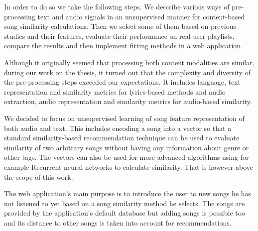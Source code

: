 In order to do so we take the following steps. We describe various ways of pre-processing text and audio signals in an unsupervised manner for content-based song similarity calculations. Then we select some of them based on previous studies and their features, evaluate their performance on real user playlists, compare the results and then implement fitting methods in a web application.

Although it originally seemed that processing both content modalities are similar, during our work on the thesis, it turned out that the complexity and diversity of the pre-processing steps exceeded our expectations. It includes language, text representation and similarity metrics for lyrics-based methods and audio extraction, audio representation
and similarity metrics for audio-based similarity. 

We decided to focus on unsupervised learning of song feature representation of both audio and text. This includes encoding a song into a vector so that a standard similarity-based recommendation technique can be used to evaluate similarity of two arbitrary songs without having any information about genre or other tags. The vectors can also be used for more advanced algorithms using for example Recurrent neural networks to calculate similarity. That is however above the scope of this work. 

The web application's main purpose is to introduce the user to new songs he has not listened to yet based on a song similarity method he selects. The songs are provided by the application's default database but adding songs is possible too and its distance to other songs is taken into account for recommendations. 
